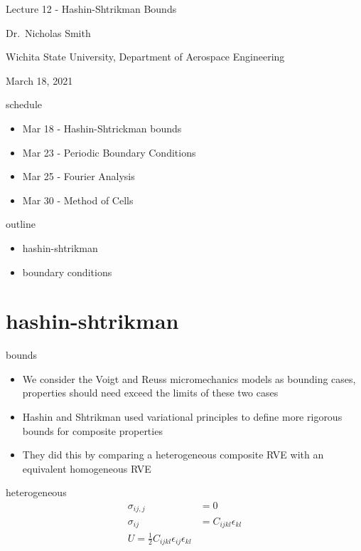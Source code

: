 \documentclass[
  letterpaper,
  ignorenonframetext,
  aspectratio=43,
  handout,
  12pt]{beamer}
\author{}
\date{}
\providecommand{\tightlist}{%
  \setlength{\itemsep}{0pt}\setlength{\parskip}{0pt}}
\providecommand{\tightlist}{%
\setlength{\itemsep}{0pt}\setlength{\parskip}{0pt}}
\begin{document}
\begin{frame}
Lecture 12 - Hashin-Shtrikman Bounds

Dr.~Nicholas Smith

Wichita State University, Department of Aerospace Engineering

March 18, 2021
\end{frame}

\begin{frame}{schedule}
\protect\hypertarget{schedule}{}
\begin{itemize}
\tightlist
\item
  Mar 18 - Hashin-Shtrickman bounds
\item
  Mar 23 - Periodic Boundary Conditions
\item
  Mar 25 - Fourier Analysis
\item
  Mar 30 - Method of Cells
\end{itemize}
\end{frame}

\begin{frame}{outline}
\protect\hypertarget{outline}{}
\begin{itemize}
\tightlist
\item
  hashin-shtrikman
\item
  boundary conditions
\end{itemize}
\end{frame}

\hypertarget{hashin-shtrikman}{%
\section{hashin-shtrikman}\label{hashin-shtrikman}}

\begin{frame}{bounds}
\protect\hypertarget{bounds}{}
\begin{itemize}
\tightlist
\item
  We consider the Voigt and Reuss micromechanics models as bounding
  cases, properties should need exceed the limits of these two cases
\item
  Hashin and Shtrikman used variational principles to define more
  rigorous bounds for composite properties
\item
  They did this by comparing a heterogeneous composite RVE with an
  equivalent homogeneous RVE
\end{itemize}
\end{frame}

\begin{frame}{heterogeneous}
\protect\hypertarget{heterogeneous}{}
\[\begin{aligned}
  \sigma_{ij,j} &= 0\\
  \sigma_{ij} &= C_{ijkl} \epsilon_{kl}\\
  U = \frac{1}{2} C_{ijkl} \epsilon_{ij}\epsilon_{kl}
\end{aligned}\]
\end{frame}
\end{document}
